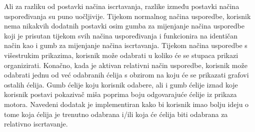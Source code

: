 \documentclass[times, utf8, diplomski]{fer}
\begin{document}
Ali za razliku od postavki načina iscrtavanja, razlike između postavki načina uspoređivanja su puno uočljivije. Tijekom normalnog načina usporedbe, korisnik nema nikakvih dodatnih postavki osim gumba za mijenjanje načina usporedbe koji je prisutan tijekom svih načina uspoređivanja i funkcionira na identičan način kao i gumb za mijenjanje načina iscrtavanja. Tijekom načina usporedbe s višestrukim prikazima, korisnik može odabrati u koliko će se stupaca prikazi organizirati. Konačno, kada je aktivan relativni način usporedbe, korisnik može odabrati jednu od već odabranih ćelija s obzirom na koju će se prikazati grafovi ostalih ćelija. Gumb ćelije koju korisnik odabere, ali i gumb ćelije iznad koje korisnik postavi pokazivač miša poprima boju odgovarajuće ćelije iz prikaza motora. Navedeni dodatak je implementiran kako bi korisnik imao bolju ideju o tome koja ćelija je trenutno odabrana i/ili koja će ćelija biti odabrana za relativno iscrtavanje.
\end{document}
